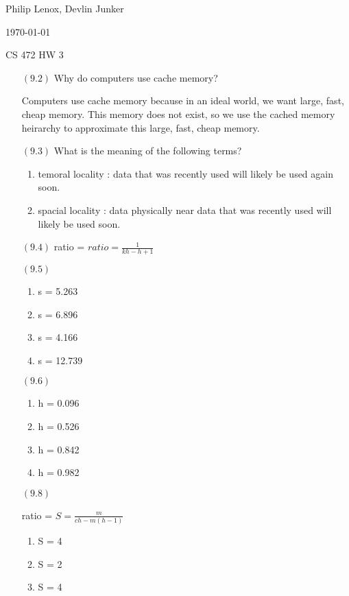 \documentclass[letterpaper,10pt,titlepage]{article}
\def\name{Philip Lenox, Devlin Junker}
\begin{document}
\hfill \name

\hfill \today

\hfill CS 472 HW 3

\begin{enumerate}



\item[$(9.2)$] Why do computers use cache memory?

Computers use cache memory because in an ideal world, we want large, fast, cheap memory. This memory does not exist, so we use the cached memory heirarchy to approximate this large, fast, cheap memory. 

\item[$(9.3)$] What is the meaning of the following terms?
\begin{enumerate}
\item temoral locality : data that was recently used will likely be used again soon.
\item spacial locality : data physically near data that was recently used will likely be used soon.
\end{enumerate}

\item[$(9.4)$] ratio = $ratio = \frac{1}{kh - h + 1}$

\item[$(9.5)$] 

\begin{enumerate}
\item s = 5.263
\item s = 6.896
\item s = 4.166
\item s = 12.739
\end{enumerate}

\item[$(9.6)$]

\begin{enumerate}
\item h = 0.096 
\item h = 0.526
\item h = 0.842
\item h = 0.982
\end{enumerate}

\item[$(9.8)$]

ratio = $S = \frac{m}{ch - m(h - 1)}$
\begin{enumerate}
\item S = 4
\item S = 2
\item S = 4
\end{enumerate}


\end{enumerate}
\end{document}
